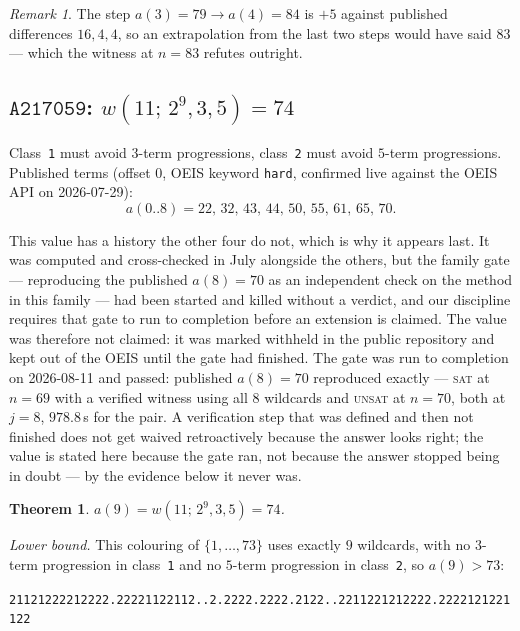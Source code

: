 \documentclass[12pt]{article}
\newtheorem{theorem}{Theorem}
\theoremstyle{remark}
\newtheorem{remark}{Remark}
\newcommand{\seq}[1]{\texttt{#1}}
\begin{document}
\begin{remark}
The step $a(3)=79 \to a(4)=84$ is $+5$ against published differences
$16,4,4$, so an extrapolation from the last two steps would have said $83$
--- which the witness at $n=83$ refutes outright.
\end{remark}

\subsection{$\seq{A217059}$: $w(11;\,2^{9},3,5)=74$}\label{sec:a217059}

Class~\texttt{1} must avoid $3$-term progressions, class~\texttt{2} must
avoid $5$-term progressions. Published terms (offset $0$, OEIS keyword
\texttt{hard}, confirmed live against the OEIS API on 2026-07-29):
\[
a(0..8) = 22,\,32,\,43,\,44,\,50,\,55,\,61,\,65,\,70 .
\]

This value has a history the other four do not, which is why it appears
last. It was computed and cross-checked in July alongside the others, but
the family gate --- reproducing the published $a(8)=70$ as an independent
check on the method in this family --- had been started and killed without a
verdict, and our discipline requires that gate to run to completion before
an extension is claimed. The value was therefore not claimed: it was marked
withheld in the public repository and kept out of the OEIS until the gate had
finished. The gate was run to completion on 2026-08-11 and
passed: published $a(8)=70$ reproduced exactly --- \textsc{sat} at $n=69$
with a verified witness using all $8$ wildcards and \textsc{unsat} at
$n=70$, both at $j=8$, $978.8$\,s for the pair. A verification step that was
defined and then not finished does not get waived retroactively because the
answer looks right; the value is stated here because the gate ran, not because
the answer stopped being in doubt --- by the evidence below it never was.

\begin{theorem}\label{thm:a217059}
$a(9) = w(11;\,2^{9},3,5) = 74$.
\end{theorem}

\emph{Lower bound.} This colouring of $\{1,\dots,73\}$ uses exactly $9$
wildcards, with no $3$-term progression in class~\texttt{1} and no $5$-term
progression in class~\texttt{2}, so $a(9) > 73$:

\begin{center}\small
\texttt{21121222212222.22221122112..2.2222.2222.2122..2211221212222.2222121221122}
\end{center}
\end{document}

